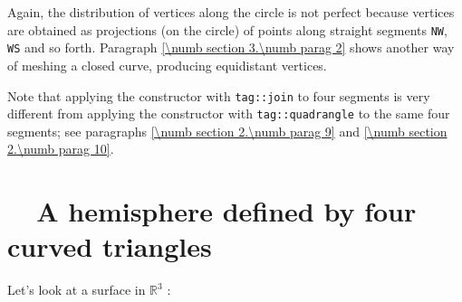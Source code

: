 Again, the distribution of vertices along the circle is not perfect
because vertices are obtained as projections (on the circle) of points
along straight segments {\small\tt NW}, {\small\tt WS} and so forth.
Paragraph \ref{\numb section 3.\numb parag 2} shows another way of meshing a closed curve,
producing equidistant vertices.

Note that applying the {\small\tt {}} constructor with {\small\tt \textcolor{tag}{tag}::join}
to four segments is very different from applying the {\small\tt {}} constructor with
{\small\tt \textcolor{tag}{tag}::quadrangle} to the same four segments;
see paragraphs \ref{\numb section 2.\numb parag 9} and \ref{\numb section 2.\numb parag 10}.


\section{~~A hemisphere defined by four curved triangles}\label{\numb section 2.\numb parag 6}

Let's look at a surface in $ \mathbb{R}^3 $ :

